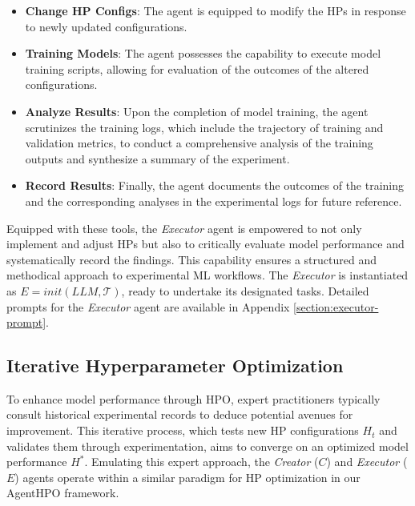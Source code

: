 \documentclass{article}
\begin{document}
\begin{itemize}[leftmargin=*]
    \item \textbf{Change HP Configs}: The agent is equipped to modify the HPs in response to newly updated configurations.
    \item \textbf{Training Models}: The agent possesses the capability to execute model training scripts, allowing for evaluation of the outcomes of the altered configurations.
    \item \textbf{Analyze Results}: Upon the completion of model training, the agent scrutinizes the training logs, which include the trajectory of training and validation metrics, to conduct a comprehensive analysis of the training outputs and synthesize a summary of the experiment.
    \item \textbf{Record Results}: Finally, the agent documents the outcomes of the training and the corresponding analyses in the experimental logs for future reference.
\end{itemize}

Equipped with these tools, the \textit{Executor} agent is empowered to not only implement and adjust HPs but also to critically evaluate model performance and systematically record the findings. This capability ensures a structured and methodical approach to experimental ML workflows. The \textit{Executor} is instantiated as $E = init(LLM, \mathcal{T})$, ready to undertake its designated tasks. Detailed prompts for the \textit{Executor} agent are available in Appendix \ref{section:executor-prompt}.



\subsection{Iterative Hyperparameter Optimization}
\label{section:iter}

To enhance model performance through HPO, expert practitioners typically consult historical experimental records to deduce potential avenues for improvement. This iterative process, which tests new HP configurations $H_t$ and validates them through experimentation, aims to converge on an optimized model performance $H^*$. Emulating this expert approach, the \textit{Creator} ($C$) and \textit{Executor} ($E$) agents operate within a similar paradigm for HP optimization in our AgentHPO framework.
\end{document}
